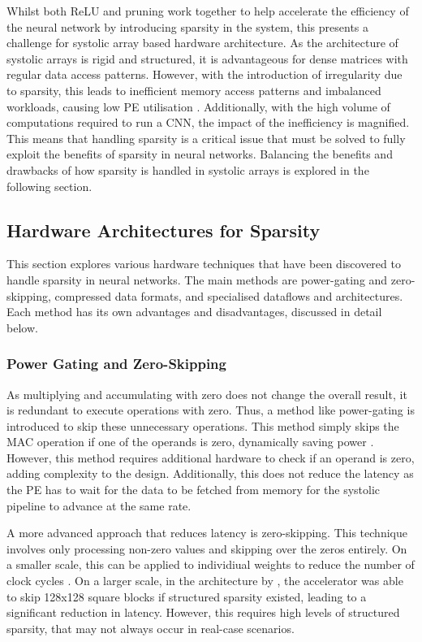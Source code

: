 \documentclass[12pt, a4paper, ukenglish]{article}
\begin{document}
        Whilst both ReLU and pruning work together to help accelerate the efficiency of the neural network by introducing sparsity in the system, this presents a challenge for systolic array based hardware architecture.
        As the architecture of systolic arrays is rigid and structured, it is advantageous for dense matrices with regular data access patterns. However, with the introduction of irregularity due to sparsity, this leads to inefficient memory access patterns and imbalanced workloads, causing low PE utilisation \cite{he_sparse-tpu_2020}. Additionally, with the high volume of computations required to run a CNN, the impact of the inefficiency is magnified. This means that handling sparsity is a critical issue that must be solved to fully exploit the benefits of sparsity in neural networks. Balancing the benefits and drawbacks of how sparsity is handled in systolic arrays is explored in the following section.

    \subsection{Hardware Architectures for Sparsity} \label{sec: hardware arch spars}

    This section explores various hardware techniques that have been discovered to handle sparsity in neural networks. The main methods are power-gating and zero-skipping, compressed data formats, and specialised dataflows and architectures. Each method has its own advantages and disadvantages, discussed in detail below.
        \subsubsection{Power Gating and Zero-Skipping} \label{sec: power-gating}
        As multiplying and accumulating with zero does not change the overall result, it is redundant to execute operations with zero. Thus, a method like power-gating is introduced to skip these unnecessary operations. This method simply skips the MAC operation if one of the operands is zero, dynamically saving power \cite{parashar_scnn_2017}. However, this method requires additional hardware to check if an operand is zero, adding complexity to the design. Additionally, this does not reduce the latency as the PE has to wait for the data to be fetched from memory for the systolic pipeline to advance at the same rate.
        
        A more advanced approach that reduces latency is zero-skipping. This technique involves only processing non-zero values and skipping over the zeros entirely. On a smaller scale, this can be applied to individiual weights to reduce the number of clock cycles \cite{duk_kim_24_2020}. On a larger scale, in the architecture by \textcite{kim_fpga_2021}, the accelerator was able to skip 128x128 square blocks if structured sparsity existed, leading to a significant reduction in latency. However, this requires high levels of structured sparsity, that may not always occur in real-case scenarios.
\end{document}
